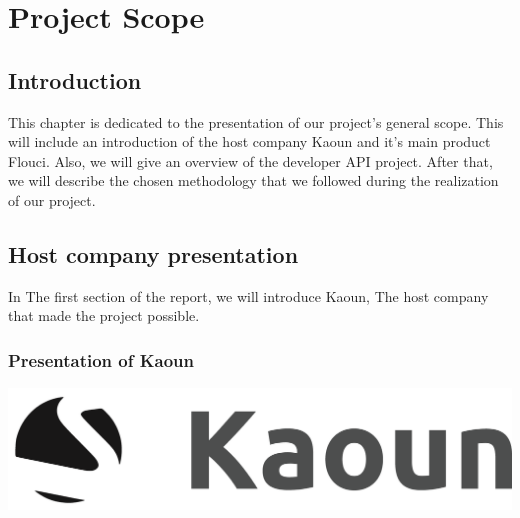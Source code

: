 \setcounter{chapter}{0} %
\chapter{Project Scope}
\adjustmtc
\minitoc  %

\graphicspath{{Chapter1/figures/}}
\pagestyle{fancy}
\fancyhf{}
\fancyhead[R]{\bfseries\rightmark}
\fancyfoot[R]{\thepage}
\renewcommand{\headrulewidth}{0.5pt}
\renewcommand{\footrulewidth}{0pt}
\renewcommand{\chaptermark}[1]{\markboth{\MakeUppercase{\chaptername~\thechapter. #1 }}{}}
\renewcommand{\sectionmark}[1]{\markright{\thechapter.\thesection~ #1}}

\begin{spacing}{1.2}

\section*{Introduction}
This chapter is dedicated to the presentation of our project's general scope.
This will include an introduction of the host company Kaoun and it's main product Flouci. Also, we will give an overview of the developer API project. After that, we will describe the chosen methodology that we followed during the realization of our project.
\section{Host company presentation}
In The first section of the report, we will introduce Kaoun, The host company that made the project possible.
\subsection{Presentation of Kaoun}
\begin{center}
	\includegraphics[scale=0.2]{kaounlogo.png}
\end{center}




\end{spacing}
